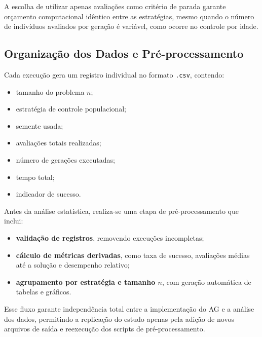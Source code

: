A escolha de utilizar apenas avaliações como critério de parada garante orçamento computacional idêntico entre as estratégias, mesmo quando o número de indivíduos avaliados por geração é variável, como ocorre no controle por idade.

\subsection{Organização dos Dados e Pré-processamento}

Cada execução gera um registro individual no formato \texttt{.csv}, contendo:

\begin{itemize}
    \item tamanho do problema $n$;
    \item estratégia de controle populacional;
    \item semente usada;
    \item avaliações totais realizadas;
    \item número de gerações executadas;
    \item tempo total;
    \item indicador de sucesso.
\end{itemize}

Antes da análise estatística, realiza-se uma etapa de pré-processamento que inclui:

\begin{itemize}
    \item \textbf{validação de registros}, removendo execuções incompletas;
    \item \textbf{cálculo de métricas derivadas}, como taxa de sucesso, avaliações médias até a solução e desempenho relativo;
    \item \textbf{agrupamento por estratégia e tamanho $n$}, com geração automática de tabelas e gráficos.
\end{itemize}

Esse fluxo garante independência total entre a implementação do AG e a análise dos dados, permitindo a replicação do estudo apenas pela adição de novos arquivos de saída e reexecução dos scripts de pré-processamento.
